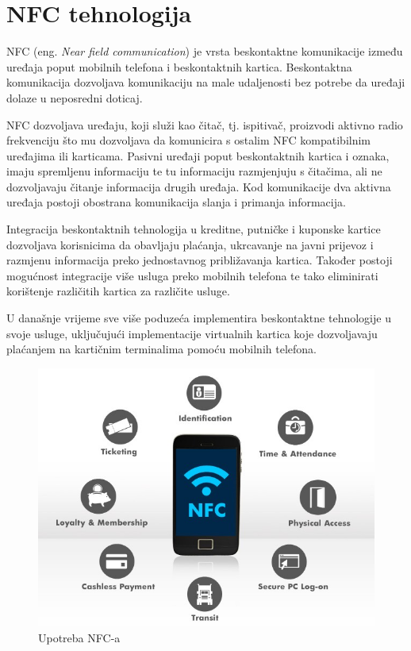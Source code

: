 \documentclass[times, utf8, zavrsni]{fer}
\begin{document}
\chapter{NFC tehnologija}
NFC (eng. \textit{Near field communication}) je vrsta beskontaktne komunikacije između uređaja poput mobilnih telefona i beskontaktnih kartica. Beskontaktna komunikacija dozvoljava komunikaciju na male udaljenosti bez potrebe da uređaji dolaze u neposredni doticaj. \par
NFC dozvoljava uređaju, koji služi kao čitač, tj. ispitivač, proizvodi aktivno radio frekvenciju što mu dozvoljava da komunicira s ostalim NFC kompatibilnim uređajima ili karticama. Pasivni uređaji poput beskontaktnih kartica i oznaka, imaju spremljenu informaciju te tu informaciju razmjenjuju s čitačima, ali ne dozvoljavaju čitanje informacija drugih uređaja. Kod komunikacije dva aktivna uređaja postoji obostrana komunikacija slanja i primanja informacija.\par 
Integracija beskontaktnih tehnologija u kreditne, putničke i kuponske kartice dozvoljava korisnicima da obavljaju plaćanja, ukrcavanje na javni prijevoz i razmjenu informacija preko jednostavnog  približavanja kartica. Također postoji mogućnost integracije više usluga preko mobilnih telefona te tako eliminirati korištenje različitih kartica za različite usluge.\par 
U današnje vrijeme sve više poduzeća implementira beskontaktne tehnologije u svoje usluge, uključujući implementacije virtualnih kartica koje dozvoljavaju plaćanjem na kartičnim terminalima pomoću mobilnih telefona.
\citep{1}

\begin{figure}[h]
\includegraphics[scale=0.4]{nfcuse.jpeg}
\centering
\caption[]{Upotreba NFC-a \citep{2}}
\centering
\end{figure}
\end{document}
